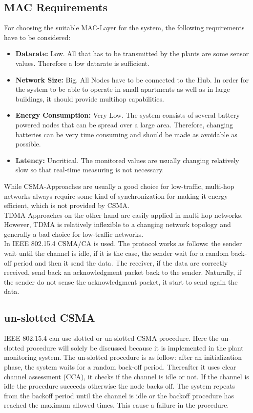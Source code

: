 \subsection{MAC Requirements}
For choosing the suitable MAC-Layer for the system, the following requirements have to be considered:

\begin{itemize}
	\item \textbf{Datarate:}
	Low. All that has to be transmitted by the plants are some sensor values. Therefore a low datarate is sufficient.
	\item \textbf{Network Size:}
	Big. All Nodes have to be connected to the Hub. In order for the system to be able to operate in small apartments as well as in large buildings, it should provide multihop capabilities.
	\item \textbf{Energy Consumption:}
	Very Low. The system consists of several battery powered nodes that can be spread over a large area. Therefore, changing batteries can be very time consuming and should be made as avoidable as possible.
	\item \textbf{Latency:}
	Uncritical. The monitored values are usually changing relatively slow so that real-time measuring is not necessary.
\end{itemize}

While CSMA-Approaches are usually a good choice for low-traffic, multi-hop networks always require some kind of synchronization for making it energy efficient, which is not provided by CSMA.\\
TDMA-Approaches on the other hand are easily applied in multi-hop networks. However, TDMA is relatively inflexible to a changing network topology and generally a bad choice for low-traffic networks.\\
In IEEE 802.15.4 CSMA/CA is used. The protocol works as follows:
the sender wait until the channel is idle, if it is the case, the sender wait for a random back-off period and then it send the data. The receiver, if the data are correctly received, send back an acknowledgment packet back to the sender. Naturally, if the sender do not sense the acknowledgment packet, it start to send again the data.\\

\subsection{un-slotted CSMA}
IEEE 802.15.4 can use slotted or un-slotted CSMA procedure. Here the un-slotted procedure will solely be discussed because it is implemented in the plant monitoring system. The un-slotted procedure is as follow: after an initialization phase, the system waits for a random back-off period. Thereafter it uses clear channel assessment (CCA), it checks if the channel is idle or not. If the channel is idle the procedure succeeds otherwise the node backs off. The system repeats from the backoff period until the channel is idle or the backoff procedure has reached the maximum allowed times. This cause a failure in the procedure.\\


